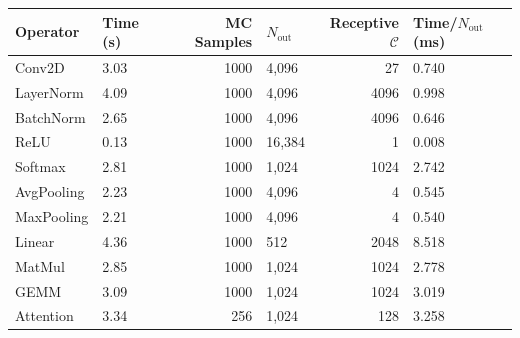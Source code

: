 \begin{tabular}{llrlrl}
\toprule
Operator & Time (s) & MC Samples & $N_{\text{out}}$ & Receptive $\mathcal{{C}}$ & Time/$N_{\text{out}}$ (ms) \\
\midrule
Conv2D & 3.03 & 1000 & 4,096 & 27 & 0.740 \\
LayerNorm & 4.09 & 1000 & 4,096 & 4096 & 0.998 \\
BatchNorm & 2.65 & 1000 & 4,096 & 4096 & 0.646 \\
ReLU & 0.13 & 1000 & 16,384 & 1 & 0.008 \\
Softmax & 2.81 & 1000 & 1,024 & 1024 & 2.742 \\
AvgPooling & 2.23 & 1000 & 4,096 & 4 & 0.545 \\
MaxPooling & 2.21 & 1000 & 4,096 & 4 & 0.540 \\
Linear & 4.36 & 1000 & 512 & 2048 & 8.518 \\
MatMul & 2.85 & 1000 & 1,024 & 1024 & 2.778 \\
GEMM & 3.09 & 1000 & 1,024 & 1024 & 3.019 \\
Attention & 3.34 & 256 & 1,024 & 128 & 3.258 \\
\bottomrule
\end{tabular}
